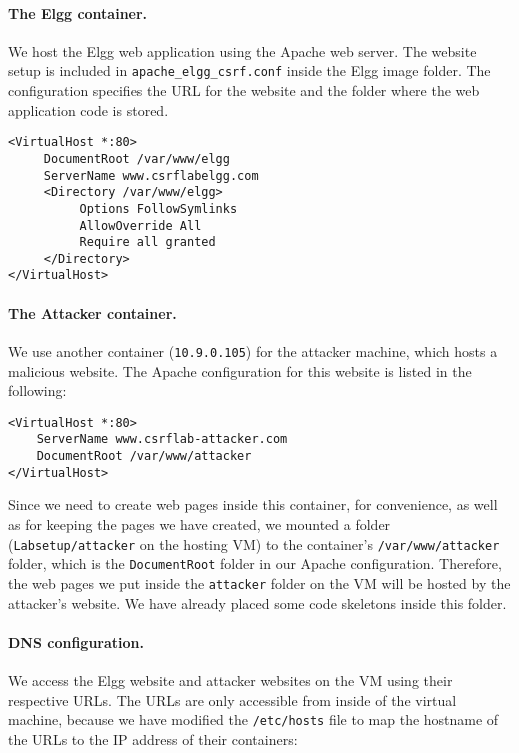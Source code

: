 \paragraph{The Elgg container.}
We host the Elgg web application using the Apache web server.
The website setup is included in
\texttt{apache\_elgg\_csrf.conf} inside the Elgg image folder.
The configuration specifies the URL for the website and
the folder where the web application code is stored.

\begin{lstlisting}
<VirtualHost *:80>
     DocumentRoot /var/www/elgg
     ServerName www.csrflabelgg.com
     <Directory /var/www/elgg>
          Options FollowSymlinks
          AllowOverride All
          Require all granted
     </Directory>
</VirtualHost>
\end{lstlisting}

\paragraph{The Attacker container.}
We use another container (\texttt{10.9.0.105}) for the 
attacker machine, which hosts a malicious website. 
The Apache configuration for this website is listed
in the following:

\begin{lstlisting}
<VirtualHost *:80>
    ServerName www.csrflab-attacker.com
    DocumentRoot /var/www/attacker
</VirtualHost>
\end{lstlisting}
 
Since we need to create web pages inside this container,
for convenience, as well as for keeping the pages we have created, 
we mounted a folder (\texttt{Labsetup/attacker} on the 
hosting VM) to the container's \texttt{/var/www/attacker}
folder, which is the \texttt{DocumentRoot} folder in our Apache
configuration. Therefore, the web pages we 
put inside the \texttt{attacker} folder on the VM
will be hosted by the attacker's website. 
We have already placed some code skeletons inside 
this folder. 


\paragraph{DNS configuration.}
We access the Elgg website and attacker 
websites on the VM using their respective URLs. 
The URLs are only accessible from inside of the virtual machine, because we
have modified the \texttt{/etc/hosts} file to map the hostname
of the URLs to the IP address of their containers:


